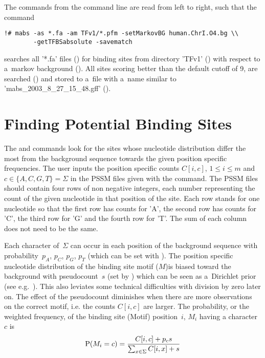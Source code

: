 The commands from the command line are read from left to right, such
that the command%
\begin{verbatim}!# mabs -as *.fa -am TFv1/*.pfm -setMarkovBG human.ChrI.O4.bg \\
        -getTFBSabsolute -savematch \end{verbatim}%
searches all '*.fa' files () for binding sites from
directory 'TFv1' () with respect to a~markov
background (). All sites scoring
better than the default cutoff of 9, are searched
() and stored to a~file with a~name similar to
 'mabs\_2003\_8\_27\_15\_48.gff' ().



\section{Finding Potential Binding Sites}
\label{sec:TFBSscan}

The  and  commands look
for the sites whose nucleotide distribution differ the most from the
background sequence towards the given position specific
frequencies. The user inputs the position specific counts $C[i,c]$,
$1\le i \le m$ and $c\in\{A,C,G,T\}=\Sigma$ in
the PSSM files given with the  command. The PSSM
files should contain four rows of non negative integers, each number
representing the count of the given nucleotide in that position of the
site. Each row stands for one nucleotide so that the first row has
counts for 'A', the second row has counts for 'C', the third row for
'G' and the fourth row for 'T'.  The sum of each column does not need
to be the same.


Each character of~$\Sigma$ can occur in each position of the
background sequence with probability~$p_A$, $p_C$, $p_G$, $p_T$ (which
can be set with ).  The position specific
nucleotide distribution of the binding site motif ($M$)is biased toward the
background with pseudocount~$s$ (set by )
which can be seen as a~Dirichlet prior (see
e.g.~\cite{durbin98}). This also leviates some technical difficulties
with division by zero later on. The effect of the pseudocount
diminishes when there are more observations on the correct motif,
i.e. the counts $C[i,c]$ are larger. The probability, or the weighted
frequency, of the binding site (Motif) position~$i$, $M_i$ having a
character $c$ is
\begin{equation}
  \label{eq:motifProb}
  \mathrm{P}(M_i=c)=\frac{C[i,c]+p_cs}{\sum_{x\in\Sigma}C[i,x]+s}
\end{equation}

